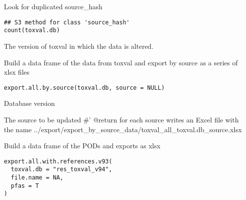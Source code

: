 \documentclass[letterpaper]{book}
\begin{document}
%
\begin{Description}\relax
Look for duplicated source\_hash
\end{Description}
%
\begin{Usage}
\begin{verbatim}
## S3 method for class 'source_hash'
count(toxval.db)
\end{verbatim}
\end{Usage}
%
\begin{Arguments}
\begin{ldescription}
\item[\code{toxval.db}] The version of toxval in which the data is altered.
\end{ldescription}
\end{Arguments}
%
\begin{Description}\relax
Build a data frame of the data from toxval and export by source as a
series of xlsx files
\end{Description}
%
\begin{Usage}
\begin{verbatim}
export.all.by.source(toxval.db, source = NULL)
\end{verbatim}
\end{Usage}
%
\begin{Arguments}
\begin{ldescription}
\item[\code{toxval.db}] Database version

\item[\code{source}] The source to be updated
\#' @return for each source writes an Excel file with the name
../export/export\_by\_source\_data/toxval\_all\_toxval.db\_source.xlsx
\end{ldescription}
\end{Arguments}
%
\begin{Description}\relax
Build a data frame of the PODs and exports as xlsx
\end{Description}
%
\begin{Usage}
\begin{verbatim}
export.all.with.references.v93(
  toxval.db = "res_toxval_v94",
  file.name = NA,
  pfas = T
)
\end{verbatim}
\end{Usage}
\end{document}
